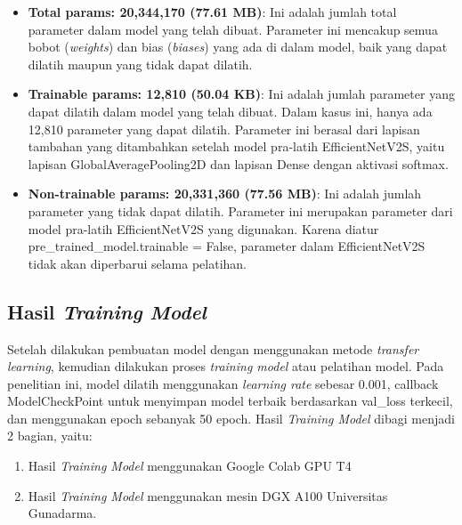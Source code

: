 \begin{itemize}
    \item \textbf{Total params: 20,344,170 (77.61 MB)}: Ini adalah jumlah total parameter dalam model yang telah dibuat. Parameter ini mencakup semua bobot (\textit{weights}) dan bias (\textit{biases}) yang ada di dalam model, baik yang dapat dilatih maupun yang tidak dapat dilatih.
    \item \textbf{Trainable params: 12,810 (50.04 KB)}: Ini adalah jumlah parameter yang dapat dilatih dalam model yang telah dibuat. Dalam kasus ini, hanya ada 12,810 parameter yang dapat dilatih. Parameter ini berasal dari lapisan tambahan yang ditambahkan setelah model pra-latih EfficientNetV2S, yaitu lapisan GlobalAveragePooling2D dan lapisan Dense dengan aktivasi softmax.
    \item \textbf{Non-trainable params: 20,331,360 (77.56 MB)}: Ini adalah jumlah parameter yang tidak dapat dilatih. Parameter ini merupakan parameter dari model pra-latih EfficientNetV2S yang digunakan. Karena diatur pre\_trained\_model.trainable = False, parameter dalam EfficientNetV2S tidak akan diperbarui selama pelatihan.
\end{itemize}

\subsection{Hasil \textit{Training Model}}
Setelah dilakukan pembuatan model dengan menggunakan metode \textit{transfer learning}, kemudian dilakukan proses \textit{training model} atau pelatihan model. Pada penelitian ini, model dilatih menggunakan \textit{learning rate} sebesar 0.001, callback ModelCheckPoint untuk menyimpan model terbaik berdasarkan val\_loss terkecil, dan menggunakan epoch sebanyak 50 epoch. 
Hasil \textit{Training Model} dibagi menjadi 2 bagian, yaitu:
\begin{enumerate}
    \item Hasil \textit{Training Model} menggunakan Google Colab GPU T4
    \item Hasil \textit{Training Model} menggunakan mesin DGX A100 Universitas Gunadarma.
\end{enumerate}

